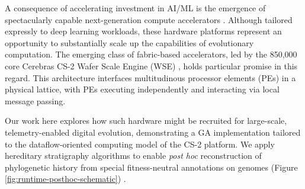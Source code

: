 A consequence of accelerating investment in AI/ML is the emergence of spectacularly capable next-generation compute accelerators \cite{zhang2016cambricon,emani2021accelerating,jia2019dissecting,medina2020habana}.
Although tailored expressly to deep learning workloads, these hardware platforms represent an opportunity to substantially scale up the capabilities of evolutionary computation.
The emerging class of fabric-based accelerators, led by the 850,000 core Cerebras CS-2 Wafer Scale Engine (WSE) \cite{lauterbach2021path}, holds particular promise in this regard.
This architecture interfaces multitudinous processor elements (PEs) in a physical lattice, with PEs executing independently and interacting via local message passing.

Our work here explores how such hardware might be recruited for large-scale, telemetry-enabled digital evolution, demonstrating a GA implementation tailored to the dataflow-oriented computing model of the CS-2 platform.
We apply hereditary stratigraphy algorithms to enable \textit{post hoc} reconstruction of phylogenetic history from special fitness-neutral annotations on genomes (Figure \ref{fig:runtime-posthoc-schematic}) \cite{moreno2022hereditary} .




